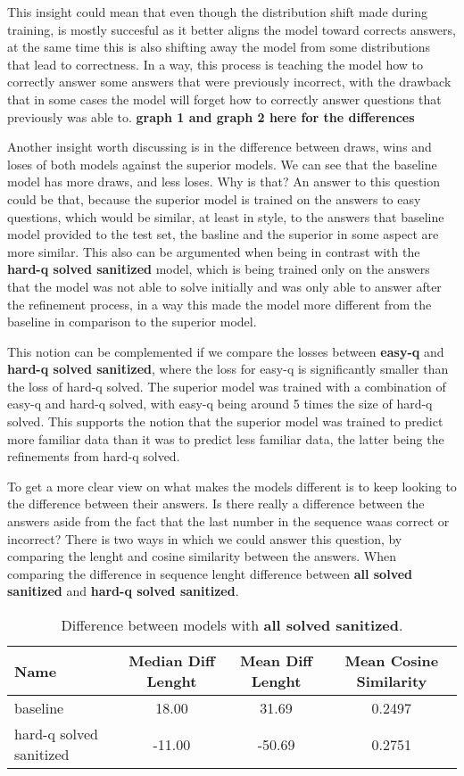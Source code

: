 \documentclass[a4paper,10pt]{article}
\begin{document}
This insight could mean that even though the distribution shift made during training, is mostly succesful as it better aligns the model toward corrects answers, at the same time this is also shifting away the model from some distributions that lead to correctness. In a way, this process is teaching the model how to correctly answer some answers that were previously incorrect, with the drawback that in some cases the model will forget how to correctly answer questions that previously was able to. 
\textbf{graph 1 and graph 2 here for the differences}

Another insight worth discussing is in the difference between draws, wins and loses of both models against the superior models. We can see that the baseline model has more draws, and less loses. Why is that? An answer to this question could be that, because the superior model is trained on the answers to easy questions, which would be similar, at least in style, to the answers that baseline model provided to the test set, the basline and the superior in some aspect are more similar. This also can be argumented when being in contrast with the \textbf{hard-q solved sanitized} model, which is being trained only on the answers that the model was not able to solve initially and was only able to answer after the refinement process, in a way this made the model more different from the baseline in comparison to the superior model.

This notion can be complemented if we compare the losses between \textbf{easy-q} and \textbf{hard-q solved sanitized}, where the loss for easy-q is significantly smaller than the loss of hard-q solved. The superior model was trained with a combination of easy-q and hard-q solved, with easy-q being around 5 times the size of hard-q solved. This supports the notion that the superior model was trained to predict more familiar data than it was to predict less familiar data, the latter being the refinements from hard-q solved.

To get a more clear view on what makes the models different is to keep looking to the difference between their answers.  Is there really a difference between the answers aside from the fact that the last number in the sequence waas correct or incorrect? There is two ways in which we could answer this question, by comparing the lenght and cosine similarity between the answers. When comparing the difference in sequence lenght difference between \textbf{all solved sanitized} and \textbf{hard-q solved sanitized}.

\begin{table}[ht]
\centering
 \begin{tabular}{|l|c|c|c|}
 \hline
 \textbf{Name} & \textbf{Median Diff Lenght} & \textbf{Mean Diff Lenght} & \textbf{Mean Cosine Similarity} \\
 \hline
 baseline & 18.00 & 31.69  & 0.2497 \\
 hard-q solved sanitized & -11.00 & -50.69 & 0.2751 \\
 \hline
 \end{tabular}
 \caption{Difference between models with \textbf{all solved sanitized}. }
\end{table}
\end{document}
